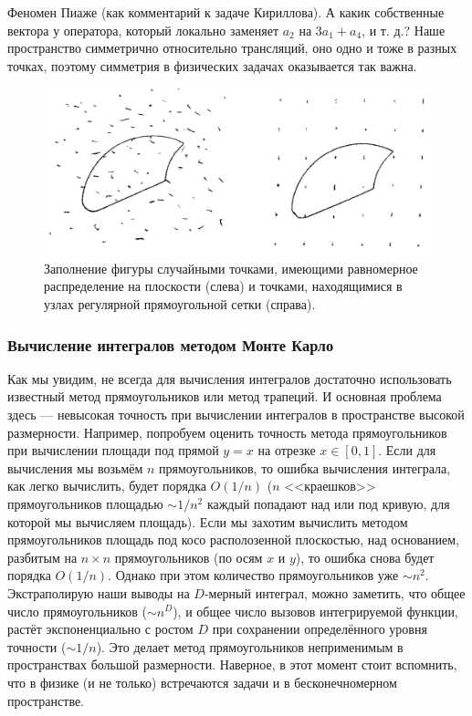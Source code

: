 \documentclass{book}
\begin{document}
Феномен Пиаже (как комментарий к задаче Кириллова). А какик собственные вектора у оператора,
который локально заменяет $a_2$ на $3 a_1 + a_4$, и т. д.? Наше пространство симметрично
относительно трансляций, оно одно и тоже в разных точках, поэтому симметрия в физических задачах
оказывается так важна.

\clearpage

\begin{figure}
	\includegraphics[width=1\linewidth]{dots-for-monte-carlo.png}
    \caption{\label{dots-for-monte-carlo}Заполнение фигуры случайными точками, имеющими равномерное
    распределение на плоскости (слева) и точками, находящимися в узлах регулярной прямоугольной
    сетки (справа).}
\end{figure}

\subsubsection{Вычисление интегралов методом Монте Карло}

Как мы увидим, не всегда для вычисления интегралов достаточно использовать известный метод
прямоугольников или метод трапеций. И основная проблема здесь --- невысокая точность при вычислении
интегралов в пространстве высокой размерности. Например, попробуем оценить точность метода
прямоугольников при вычислении площади под прямой $y = x$ на отрезке $x \in [0, 1]$. Если для
вычисления мы возьмём $n$ прямоугольников, то ошибка вычисления интеграла, как легко вычислить,
будет порядка $O(1/n)$ ($n$ <<краешков>> прямоугольников площадью $\sim 1/n^2$ каждый попадают над
или под кривую, для которой мы вычисляем площадь). Если мы захотим вычислить методом
прямоугольников площадь под косо располозенной плоскостью, над основанием, разбитым на $n \times n$
прямоугольников (по осям $x$ и $y$), то ошибка снова будет порядка $O(1/n)$. Однако при этом
количество прямоугольников уже $\sim n^2$. Экстраполирую наши выводы на $D$-мерный интеграл, можно
заметить, что общее число прямоугольников ($\sim n^D$), и общее число вызовов интегрируемой
функции, растёт экспоненциально с ростом $D$ при сохранении определённого уровня точности ($\sim
1/n$). Это делает метод прямоугольников неприменимым в пространствах большой размерности. Наверное,
в этот момент стоит вспомнить, что в физике (и не только) встречаются задачи и в бесконечномерном
пространстве.
\end{document}
